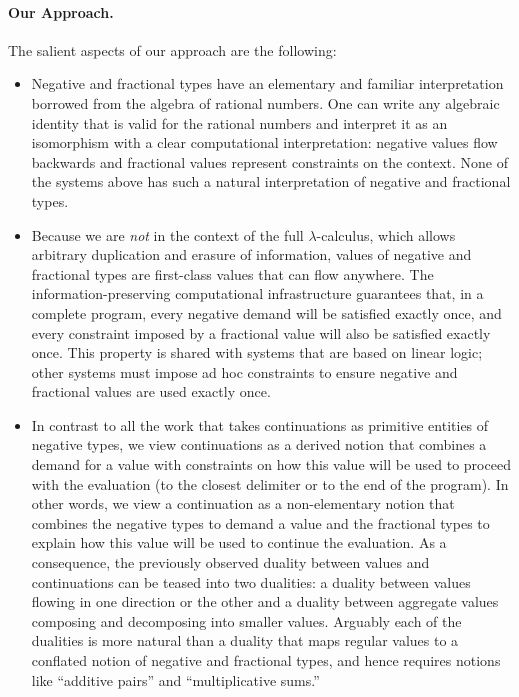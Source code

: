 \documentclass[preprint]{sigplanconf}
\begin{document}
\paragraph*{Our Approach.} The salient aspects of our approach are the
following:
\begin{itemize}
\item Negative and fractional types have an elementary and familiar
  interpretation borrowed from the algebra of rational numbers. One can write
  any algebraic identity that is valid for the rational numbers and interpret
  it as an isomorphism with a clear computational interpretation: negative
  values flow backwards and fractional values represent constraints on the
  context. None of the systems above has such a natural interpretation of
  negative and fractional types.
\item Because we are \emph{not} in the context of the full
  $\lambda$-calculus, which allows arbitrary duplication and erasure of
  information, values of negative and fractional types are first-class values
  that can flow anywhere. The information-preserving computational
  infrastructure guarantees that, in a complete program, every negative
  demand will be satisfied exactly once, and every constraint imposed by a
  fractional value will also be satisfied exactly once. This property is
  shared with systems that are based on linear logic; other systems must
  impose ad hoc constraints to ensure negative and fractional values are used
  exactly once.
\item In contrast to all the work that takes continuations as primitive
  entities of negative types, we view continuations as a derived notion that
  combines a demand for a value with constraints on how this value will be
  used to proceed with the evaluation (to the closest delimiter or to the end
  of the program). In other words, we view a continuation as a non-elementary
  notion that combines the negative types to demand a value and the
  fractional types to explain how this value will be used to continue the
  evaluation. As a consequence, the previously observed duality between
  values and continuations can be teased into two dualities: a duality
  between values flowing in one direction or the other and a duality between
  aggregate values composing and decomposing into smaller values. Arguably
  each of the dualities is more natural than a duality that maps regular
  values to a conflated notion of negative and fractional types, and hence
  requires notions like ``additive pairs'' and ``multiplicative sums.''
\end{itemize}
\end{document}
